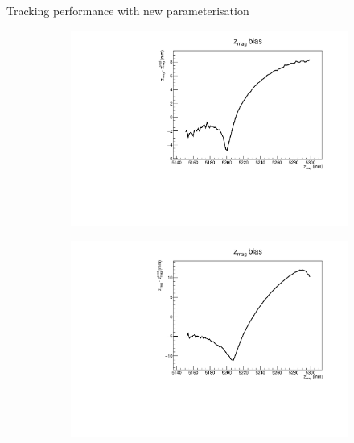 \documentclass[xcolor={dvipsnames}]{beamer}
\begin{document}
\begin{frame}{Tracking performance with new parameterisation}
  \vspace{0.0cm}
  \begin{figure}[htb]
    \centering
    \begin{subfigure}{0.4\textwidth}
      \includegraphics[width=1\textwidth]{Plots/z_mag_position_bias_old_parameterisation.pdf}
    \end{subfigure}%
    \begin{subfigure}{0.4\textwidth}
      \includegraphics[width=1\textwidth]{Plots/z_mag_position_bias_new_parameterisation.pdf}
    \end{subfigure}
    \begin{subfigure}{0.4\textwidth}

\end{subfigure}
\end{figure}
\end{frame}
\end{document}
